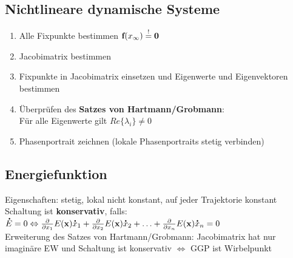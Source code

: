 \documentclass[fs, footer]{latex4ei}
\begin{document}
\begin{multicols*}{4}
\section{Nichtlineare dynamische Systeme}
	\begin{enumerate}
		\item Alle Fixpunkte bestimmen $\textbf{f}(x_\infty) \stackrel{!}{=} \textbf{0}$
		\item Jacobimatrix bestimmen
		\item Fixpunkte in Jacobimatrix einsetzen und Eigenwerte und Eigenvektoren bestimmen
		\item Überprüfen des \textbf{Satzes von Hartmann/Grobmann}: \\Für alle Eigenwerte gilt $Re\{\lambda_i\} \neq 0$
		\item Phasenportrait zeichnen (lokale Phasenportraits stetig verbinden)
	\end{enumerate}
\subsection{Energiefunktion}
Eigenschaften: stetig, lokal nicht konstant, auf jeder Trajektorie konstant\\
Schaltung ist \textbf{konservativ}, falls:\\
$\accentset{\mbox{\textrm{\large\bfseries .}} }{E} = 0 \Leftrightarrow \frac{\partial}{\partial x_1} E(\textbf{x}) \accentset{\mbox{\textrm{\large\bfseries .}} }{x}_1 + \frac{\partial}{\partial x_2} E(\textbf{x}) \accentset{\mbox{\textrm{\large\bfseries .}} }{x}_2 + \hdots + \frac{\partial}{\partial x_n} E(\textbf{x}) \accentset{\mbox{\textrm{\large\bfseries .}} }{x}_n = 0$\\
Erweiterung des Satzes von Hartmann/Grobmann: Jacobimatrix hat nur imaginäre EW und Schaltung ist konservativ $\Leftrightarrow$ GGP ist Wirbelpunkt\\

\end{multicols*}
\end{document}
